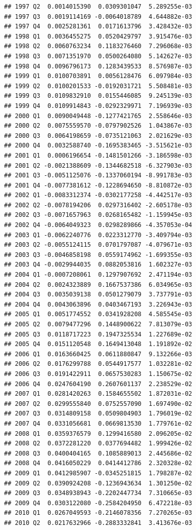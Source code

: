 \documentclass[12pt,a4paper,]{article}
\newcommand{\0}{\mathbf{0}}
\begin{document}
\begin{verbatim}
## 1997 Q2  0.0014015390  0.0309301047  5.289255e-03
## 1997 Q3  0.0019114169 -0.0064018789  4.644882e-03
## 1997 Q4  0.0025281361  0.0171613796  3.428432e-03
## 1998 Q1  0.0036455275  0.0520429797  3.915476e-03
## 1998 Q2  0.0060763234  0.1183276460  7.296068e-03
## 1998 Q3  0.0071351970  0.0500264080  5.142627e-03
## 1998 Q4  0.0096796173  0.1283439533  8.576987e-03
## 1999 Q1  0.0100703891  0.0056128476  6.097984e-03
## 1999 Q2  0.0100201533 -0.0192031721  5.508481e-03
## 1999 Q3  0.0109832910  0.0155446085  9.245139e-03
## 1999 Q4  0.0109914843 -0.0292329971  7.196939e-03
## 2000 Q1  0.0090049448 -0.1277421765  2.558646e-03
## 2000 Q2  0.0075559570 -0.0797902526  1.043867e-03
## 2000 Q3  0.0064198659 -0.0735121063  2.021629e-03
## 2000 Q4  0.0032588740 -0.1695383465 -3.515621e-03
## 2001 Q1  0.0006196654 -0.1481501266 -3.186598e-03
## 2001 Q2 -0.0021388609 -0.1344682518 -6.327903e-03
## 2001 Q3 -0.0051125076 -0.1337060194 -8.991783e-03
## 2001 Q4 -0.0077381612 -0.1228694650 -8.810872e-03
## 2002 Q1 -0.0083312374 -0.0302177258 -4.442517e-03
## 2002 Q2 -0.0078194206  0.0297316402 -2.605178e-03
## 2002 Q3 -0.0071657963  0.0268165482 -1.159945e-03
## 2002 Q4 -0.0064049323  0.0298289866 -4.357053e-04
## 2003 Q1 -0.0062240776  0.0223312770 -3.409794e-03
## 2003 Q2 -0.0055124115  0.0701797087 -4.079671e-03
## 2003 Q3 -0.0046858198  0.0559174962 -1.699355e-03
## 2003 Q4 -0.0029944035  0.0882053816  1.602327e-03
## 2004 Q1 -0.0007208061  0.1297907692  2.471194e-03
## 2004 Q2  0.0024323889  0.1667537386  6.034965e-03
## 2004 Q3  0.0035039138  0.0501279079  3.737791e-03
## 2004 Q4  0.0043063896  0.0403467193  3.226943e-03
## 2005 Q1  0.0051774552  0.0341928208  4.585545e-03
## 2005 Q2  0.0079477296  0.1448900622  7.813079e-03
## 2005 Q3  0.0118717223  0.1947325534  1.227689e-02
## 2005 Q4  0.0151120548  0.1649413048  1.191892e-02
## 2006 Q1  0.0163660425  0.0611880847  9.132266e-03
## 2006 Q2  0.0176299788  0.0544917577  1.032281e-02
## 2006 Q3  0.0191422911  0.0657530283  1.150675e-02
## 2006 Q4  0.0247604190  0.2607601137  2.238529e-02
## 2007 Q1  0.0281420263  0.1584655502  1.872031e-02
## 2007 Q2  0.0299555840  0.0752557090  1.697490e-02
## 2007 Q3  0.0314809158  0.0509804903  1.796019e-02
## 2007 Q4  0.0331056681  0.0669813530  1.779761e-02
## 2008 Q1  0.0359376579  0.1299416580  2.096205e-02
## 2008 Q2  0.0372281220  0.0377694482  1.999426e-02
## 2008 Q3  0.0400404165  0.1085889013  2.445686e-02
## 2008 Q4  0.0416050229  0.0414412786  2.320328e-02
## 2009 Q1  0.0412985907 -0.0345251815  1.798287e-02
## 2009 Q2  0.0390924208 -0.1236943634  1.301250e-02
## 2009 Q3  0.0348938943 -0.2202447734  7.310665e-03
## 2009 Q4  0.0303122080 -0.2584204950  6.472218e-03
## 2010 Q1  0.0267049593 -0.2146078356  7.270265e-03
## 2010 Q2  0.0217632966 -0.2883332841  3.413676e-03
\end{verbatim}
\end{document}
